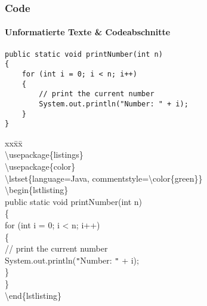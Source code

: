 
\begin{frame}[fragile]
\frametitle{Code}
\framesubtitle{Unformatierte Texte \& Codeabschnitte}
\vspace{3mm}
\scriptsize
{}
\begin{lstlisting}
public static void printNumber(int n)
{
    for (int i = 0; i < n; i++)
    {
        // print the current number
        System.out.println("Number: " + i);
    }
}
\end{lstlisting}

\footnotesize
\vspace{-2mm}

\begin{ttfamily}
\begin{tabbing}
xx\=xx\=\kill\\
\color{nounibaredI}\textbackslash usepackage\color{black}\{listings\}\\
\color{nounibaredI}\textbackslash usepackage\color{black}\{color\}\\
\color{nounibaredI}\textbackslash lstset\color{black}\{language=Java, commentstyle=\color{nounibaredI}\textbackslash color\color{black}\{green\}\}\\
\color{unibablueI}\textbackslash begin\color{black}\{lstlisting\}\\
public static void printNumber(int n)\\
\{\\
\>for (int i = 0; i < n; i++)\\
\>\{\\
\>\>// print the current number\\
\>\>System.out.println(\verb|"|Number: \verb|"| + i);\\
\>\}\\
\}\\
\color{unibablueI}\textbackslash end\color{black}\{lstlisting\}\\
\end{tabbing}
\end{ttfamily}
\normalsize
\end{frame}




